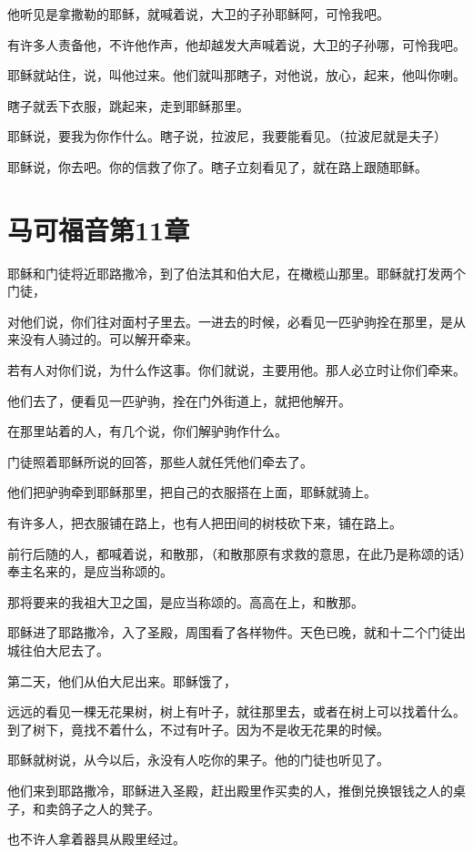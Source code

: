 \documentclass[12pt,oneside]{book}
\begin{document}
他听见是拿撒勒的耶稣，就喊着说，大卫的子孙耶稣阿，可怜我吧。

有许多人责备他，不许他作声，他却越发大声喊着说，大卫的子孙哪，可怜我吧。

耶稣就站住，说，叫他过来。他们就叫那瞎子，对他说，放心，起来，他叫你喇。

瞎子就丢下衣服，跳起来，走到耶稣那里。

耶稣说，要我为你作什么。瞎子说，拉波尼，我要能看见。（拉波尼就是夫子）

耶稣说，你去吧。你的信救了你了。瞎子立刻看见了，就在路上跟随耶稣。

\chapter{马可福音第11章}
耶稣和门徒将近耶路撒冷，到了伯法其和伯大尼，在橄榄山那里。耶稣就打发两个门徒，

对他们说，你们往对面村子里去。一进去的时候，必看见一匹驴驹拴在那里，是从来没有人骑过的。可以解开牵来。

若有人对你们说，为什么作这事。你们就说，主要用他。那人必立时让你们牵来。

他们去了，便看见一匹驴驹，拴在门外街道上，就把他解开。

在那里站着的人，有几个说，你们解驴驹作什么。

门徒照着耶稣所说的回答，那些人就任凭他们牵去了。

他们把驴驹牵到耶稣那里，把自己的衣服搭在上面，耶稣就骑上。

有许多人，把衣服铺在路上，也有人把田间的树枝砍下来，铺在路上。

前行后随的人，都喊着说，和散那，（和散那原有求救的意思，在此乃是称颂的话）奉主名来的，是应当称颂的。

那将要来的我祖大卫之国，是应当称颂的。高高在上，和散那。

耶稣进了耶路撒冷，入了圣殿，周围看了各样物件。天色已晚，就和十二个门徒出城往伯大尼去了。

第二天，他们从伯大尼出来。耶稣饿了，

远远的看见一棵无花果树，树上有叶子，就往那里去，或者在树上可以找着什么。到了树下，竟找不着什么，不过有叶子。因为不是收无花果的时候。

耶稣就树说，从今以后，永没有人吃你的果子。他的门徒也听见了。

他们来到耶路撒冷，耶稣进入圣殿，赶出殿里作买卖的人，推倒兑换银钱之人的桌子，和卖鸽子之人的凳子。

也不许人拿着器具从殿里经过。
\end{document}
